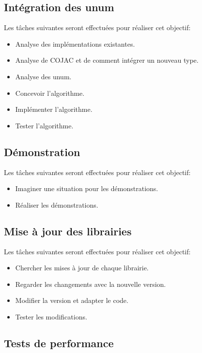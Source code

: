 \subsection{Intégration des unum}

Les tâches suivantes seront effectuées pour réaliser cet objectif:
\begin{itemize}
    \item Analyse des implémentations existantes.
    \item Analyse de COJAC et de comment intégrer un nouveau type.
    \item Analyse des unum.
    \item Concevoir l'algorithme.
    \item Implémenter l'algorithme.
    \item Tester l'algorithme.
\end{itemize}

\subsection{Démonstration}

Les tâches suivantes seront effectuées pour réaliser cet objectif:
\begin{itemize}
    \item Imaginer une situation pour les démonstrations.
    \item Réaliser les démonstrations.
\end{itemize}

\subsection{Mise à jour des librairies}

Les tâches suivantes seront effectuées pour réaliser cet objectif:
\begin{itemize}
    \item Chercher les mises à jour de chaque librairie.
    \item Regarder les changements avec la nouvelle version.
    \item Modifier la version et adapter le code.
    \item Tester les modifications.
\end{itemize}

\subsection{Tests de performance}

